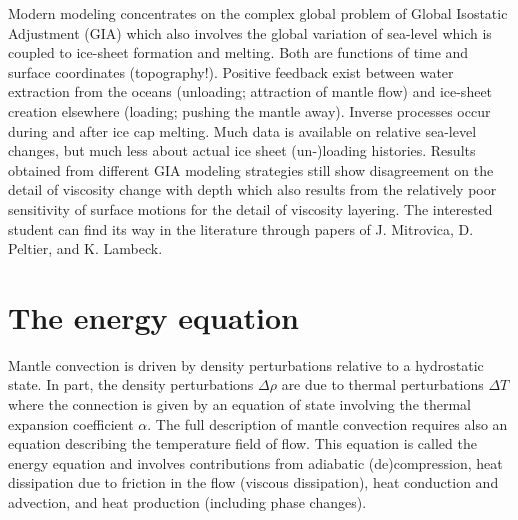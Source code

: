 Modern modeling concentrates on the complex global problem of Global Isostatic
Adjustment (GIA) which also involves the global variation of sea-level which is coupled
to ice-sheet formation and melting. Both are functions of time and surface coordinates
(topography!). Positive feedback exist between water extraction from the oceans
(unloading; attraction of mantle flow) and ice-sheet creation elsewhere (loading; pushing
the mantle away). Inverse processes occur during and after ice cap melting. Much data is
available on relative sea-level changes, but much less about actual ice sheet (un-)loading
histories. Results obtained from different GIA modeling strategies still show
disagreement on the detail of viscosity change with depth which also results from the
relatively poor sensitivity of surface motions for the detail of viscosity layering. The
interested student can find its way in the literature through papers of J. Mitrovica, D.
Peltier, and K. Lambeck.

\newpage
\section{The energy equation}

Mantle convection is driven by density perturbations relative to a hydrostatic state. In
part, the density perturbations $\Delta\rho$ are due to thermal perturbations $\Delta T$ where the
connection is given by an equation of state involving the thermal expansion 
coefficient $\alpha$.
The full description of mantle convection requires also an equation describing the
temperature field of flow. This equation is called the energy equation and involves
contributions from adiabatic (de)compression, heat dissipation due to friction in the flow
(viscous dissipation), heat conduction and advection, and heat production (including
phase changes).

